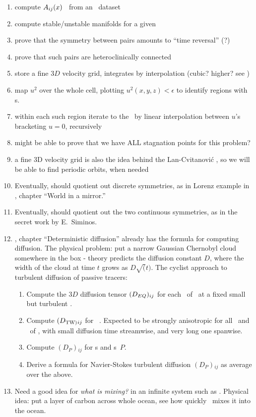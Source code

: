 \begin{enumerate}
  \item compute ${A}_{ij}(x)$ \velgradmat\
    from an \uEQ\ dataset
  \item compute stable/unstable manifolds
        for a given {\stagp}
  \item prove that the symmetry between {\stagp}
        pairs amounts to ``time reversal'' (?)
  \item prove that such {\stagp}
        pairs are heteroclinically connected
  \item store a fine $3D$ velocity grid, integrates by
    interpolation (cubic? higher? see )
  \item map $u^2$ over the whole cell, plotting
    $u^2(x,y,z) < \epsilon$ to identify regions with \stagp s.
  \item within each such region iterate to the \stagp\ by linear
    interpolation between $u$'s bracketing $u=0$, recursively
  \item might be able to prove that we have ALL stagnation points
    for this problem?
  \item a fine 3D velocity grid is also the idea behind
    the Lan-Cvitanovi\'c \descent{},
    so we will be able to find periodic orbits, when
    needed
  \item Eventually, should quotient out discrete symmetries,
        as in Lorenz example in \wwwcb{}, chapter ``World in a mirror.''
  \item Eventually, should quotient out the two continuous symmetries,
        as in the secret work by E.~Siminos.
  \item \wwwcb{}, chapter ``Deterministic diffusion''
    already has the formula for computing diffusion. The physical
    problem:
    put a narrow Gaussian Chernobyl cloud somewhere in the box -
    theory predicts the diffusion constant $D$,
    where the width of the cloud at time $t$ grows as
    $D\sqrt(t)$. The cyclist approach to turbulent diffusion of
    passive tracers:
       \begin{enumerate}
         \item Compute the $3D$ diffusion tensor $(D_{{EQ}}){}_{ij}$
         for each \tEQ{}\ of \pCf\ at a fixed
         small but turbulent \Reynolds.
         \item Compute $(D_{{\text{TW)}}}{}_{ij}$ for \reqva\ \tTW. Expected
         to be strongly anisotropic for all \eqva\ and \reqva\ of
         \pCf, with small diffusion time
         streamwise, and very long one spanwise.
         \item Compute $(D_P){}_{ij}$ for \po s and \rpo s\ $P$.
         \item Derive a formula for Navier-Stokes turbulent diffusion
                $(D_P){}_{ij}$ as average over the above.
       \end{enumerate}
  \item Need a good idea for {\em what is mixing?} in an infinite
    system such as \pCf. Physical
    idea: put a layer of carbon
    across whole ocean, see how quickly \pCf\ mixes it into
    the ocean.
\end{enumerate}

